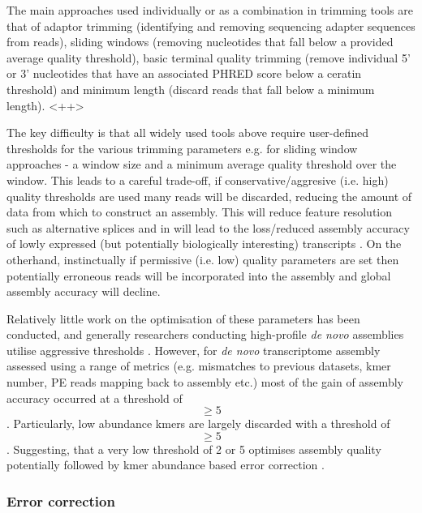 The main approaches used individually or as a combination in trimming tools are that 
of adaptor trimming (identifying and removing sequencing adapter sequences from reads),
sliding windows (removing nucleotides that fall below a provided average quality threshold),
basic terminal quality trimming (remove individual 5' or 3' nucleotides that have an associated PHRED score
below a ceratin threshold) and minimum length (discard reads that fall below a minimum length). 
\citep{}<++> %

The key difficulty is that all widely used tools above require user-defined thresholds
for the various trimming parameters e.g. for sliding window approaches - a window size
and a minimum average quality threshold over the window.  
This leads to a careful trade-off, if conservative/aggresive (i.e. high) quality thresholds
are used many reads will be discarded, reducing the amount of data from which to 
construct an assembly.  This will reduce feature resolution such as alternative splices 
and in will lead to the loss/reduced assembly accuracy of lowly expressed (but potentially biologically interesting) transcripts \citep{MacManes2014}. On the otherhand, instinctually if permissive (i.e. low)
quality parameters are set then potentially erroneous reads will be incorporated into the assembly
and global assembly accuracy will decline. 

Relatively little work on the optimisation of these parameters has been conducted, and generally
researchers conducting high-profile \textit{de novo} assemblies utilise aggressive thresholds \citep{MacManes2014}.
However, for \textit{de novo} transcriptome assembly assessed using a range of metrics
(e.g. mismatches to previous datasets, kmer number, PE reads mapping back to assembly etc.)
most of the gain of assembly accuracy occurred at a threshold of \[\geq 5\].
Particularly, low abundance kmers are largely discarded with a threshold of \[\geq 5\].
Suggesting, that a very low threshold of 2 or 5 optimises assembly quality potentially
followed by kmer abundance based error correction \citep{MacManes2014}.











\subsubsection{Error correction}

